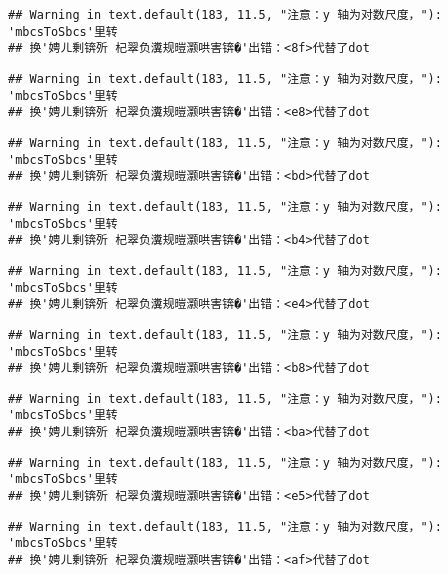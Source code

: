 \documentclass[
]{article}
\begin{document}
\begin{verbatim}
## Warning in text.default(183, 11.5, "注意：y 轴为对数尺度，"): 'mbcsToSbcs'里转
## 换'娉ㄦ剰锛歽 杞翠负瀵规暟灏哄害锛�'出错：<8f>代替了dot
\end{verbatim}

\begin{verbatim}
## Warning in text.default(183, 11.5, "注意：y 轴为对数尺度，"): 'mbcsToSbcs'里转
## 换'娉ㄦ剰锛歽 杞翠负瀵规暟灏哄害锛�'出错：<e8>代替了dot
\end{verbatim}

\begin{verbatim}
## Warning in text.default(183, 11.5, "注意：y 轴为对数尺度，"): 'mbcsToSbcs'里转
## 换'娉ㄦ剰锛歽 杞翠负瀵规暟灏哄害锛�'出错：<bd>代替了dot
\end{verbatim}

\begin{verbatim}
## Warning in text.default(183, 11.5, "注意：y 轴为对数尺度，"): 'mbcsToSbcs'里转
## 换'娉ㄦ剰锛歽 杞翠负瀵规暟灏哄害锛�'出错：<b4>代替了dot
\end{verbatim}

\begin{verbatim}
## Warning in text.default(183, 11.5, "注意：y 轴为对数尺度，"): 'mbcsToSbcs'里转
## 换'娉ㄦ剰锛歽 杞翠负瀵规暟灏哄害锛�'出错：<e4>代替了dot
\end{verbatim}

\begin{verbatim}
## Warning in text.default(183, 11.5, "注意：y 轴为对数尺度，"): 'mbcsToSbcs'里转
## 换'娉ㄦ剰锛歽 杞翠负瀵规暟灏哄害锛�'出错：<b8>代替了dot
\end{verbatim}

\begin{verbatim}
## Warning in text.default(183, 11.5, "注意：y 轴为对数尺度，"): 'mbcsToSbcs'里转
## 换'娉ㄦ剰锛歽 杞翠负瀵规暟灏哄害锛�'出错：<ba>代替了dot
\end{verbatim}

\begin{verbatim}
## Warning in text.default(183, 11.5, "注意：y 轴为对数尺度，"): 'mbcsToSbcs'里转
## 换'娉ㄦ剰锛歽 杞翠负瀵规暟灏哄害锛�'出错：<e5>代替了dot
\end{verbatim}

\begin{verbatim}
## Warning in text.default(183, 11.5, "注意：y 轴为对数尺度，"): 'mbcsToSbcs'里转
## 换'娉ㄦ剰锛歽 杞翠负瀵规暟灏哄害锛�'出错：<af>代替了dot
\end{verbatim}
\end{document}
